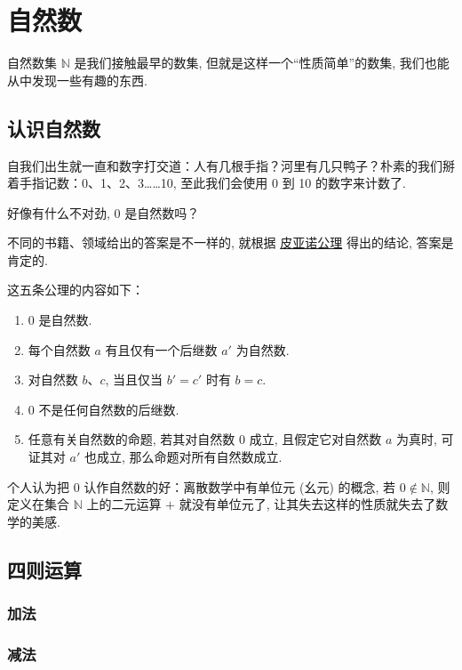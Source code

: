 \chapter{自然数} \label{chap:natural-number}

自然数集 $\mathbb{N}$ 是我们接触最早的数集, 但就是这样一个“性质简单”的数集, 我们也能从中发现一些有趣的东西.

\section{认识自然数} \label{sec:understand-natural-number}

自我们出生就一直和数字打交道：人有几根手指？河里有几只鸭子？朴素的我们掰着手指记数：0、1、2、3……10, 至此我们会使用 0 到 10 的数字来计数了.

好像有什么不对劲, 0 是自然数吗？

不同的书籍、领域给出的答案是不一样的, 就根据 \href{https://zh.wikipedia.org/wiki/\%E7\%9A\%AE\%E4\%BA\%9A\%E8\%AF\%BA\%E5\%85\%AC\%E7\%90\%86}{皮亚诺公理} 得出的结论, 答案是肯定的.

这五条公理的内容如下：

\begin{enumerate}
  \item $0$ 是自然数.
  \item 每个自然数 $a$ 有且仅有一个后继数 $a'$ 为自然数.
  \item 对自然数 $b$、$c$, 当且仅当 $b' = c'$ 时有 $b = c$.
  \item $0$ 不是任何自然数的后继数.
  \item 任意有关自然数的命题, 若其对自然数 $0$ 成立, 且假定它对自然数 $a$ 为真时, 可证其对 $a'$ 也成立, 那么命题对所有自然数成立.
\end{enumerate}

个人认为把 0 认作自然数的好：离散数学中有单位元 (幺元) 的概念, 若 $0 \notin \mathbb{N}$, 则定义在集合 $\mathbb{N}$ 上的二元运算 $+$ 就没有单位元了, 让其失去这样的性质就失去了数学的美感.

\section{四则运算} \label{sec:four-arithmetic-operations}

\subsection{加法} \label{subsec:addition}

\subsection{减法} \label{subsec:subtraction}

